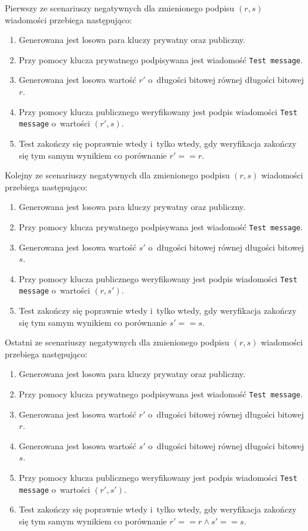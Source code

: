\documentclass{article}
\begin{document}
        Pierwszy ze scenariuszy negatywnych dla zmienionego podpisu $(r, s)$ wiadomości przebiega następująco:
        
        \begin{enumerate}
            \item Generowana jest losowa para kluczy prywatny oraz publiczny.
            \item Przy pomocy klucza prywatnego podpisywana jest wiadomość \verb+Test message+.
            \item Generowana jest losowa wartość $r'$ o~długości bitowej równej długości bitowej $r$.
            \item Przy pomocy klucza publicznego weryfikowany jest podpis wiadomości \verb+Test message+ o~wartości $(r', s)$.
            \item Test zakończy się poprawnie wtedy i~tylko wtedy, gdy weryfikacja zakończy się tym samym wynikiem co porównanie $r' == r$.
        \end{enumerate}
        
        Kolejny ze scenariuszy negatywnych dla zmienionego podpisu $(r, s)$ wiadomości przebiega następująco:
        
        \begin{enumerate}
            \item Generowana jest losowa para kluczy prywatny oraz publiczny.
            \item Przy pomocy klucza prywatnego podpisywana jest wiadomość \verb+Test message+.
            \item Generowana jest losowa wartość $s'$ o~długości bitowej równej długości bitowej $s$.
            \item Przy pomocy klucza publicznego weryfikowany jest podpis wiadomości \verb+Test message+ o~wartości $(r, s')$.
            \item Test zakończy się poprawnie wtedy i~tylko wtedy, gdy weryfikacja zakończy się tym samym wynikiem co porównanie $s' == s$.
        \end{enumerate}
        
        Ostatni ze scenariuszy negatywnych dla zmienionego podpisu $(r, s)$ wiadomości przebiega następująco:
        
        \begin{enumerate}
            \item Generowana jest losowa para kluczy prywatny oraz publiczny.
            \item Przy pomocy klucza prywatnego podpisywana jest wiadomość \verb+Test message+.
            \item Generowana jest losowa wartość $r'$ o~długości bitowej równej długości bitowej $r$.
            \item Generowana jest losowa wartość $s'$ o~długości bitowej równej długości bitowej $s$.
            \item Przy pomocy klucza publicznego weryfikowany jest podpis wiadomości \verb+Test message+ o~wartości $(r', s')$.
            \item Test zakończy się poprawnie wtedy i~tylko wtedy, gdy weryfikacja zakończy się tym samym wynikiem co porównanie $r' == r \wedge s' == s$.
        \end{enumerate}
        
\end{document}
